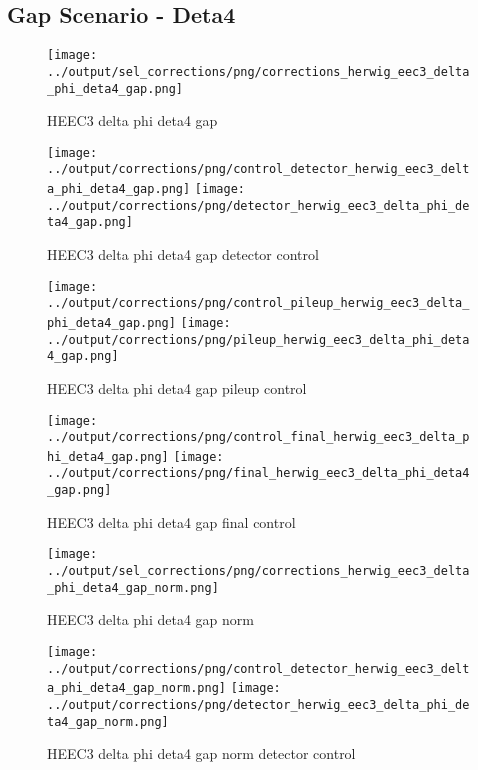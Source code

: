 \documentclass[11pt]{book}
\begin{document}
\clearpage
\subsection{Gap Scenario - Deta4}
\begin{figure}[ht]
\centering
\texttt{[image: ../output/sel\_corrections/png/corrections\_herwig\_eec3\_delta\_phi\_deta4\_gap.png]}
\caption{HEEC3 delta phi deta4 gap}
\label{fig:HEEC3_delta_phi_deta4_gap}
\end{figure}

\begin{figure}[ht]
\centering
\texttt{[image: ../output/corrections/png/control\_detector\_herwig\_eec3\_delta\_phi\_deta4\_gap.png]}
\texttt{[image: ../output/corrections/png/detector\_herwig\_eec3\_delta\_phi\_deta4\_gap.png]}
\caption{HEEC3 delta phi deta4 gap detector control}
\label{fig:HEEC3_delta_phi_deta4_gap_detector_control}
\end{figure}

\begin{figure}[ht]
\centering
\texttt{[image: ../output/corrections/png/control\_pileup\_herwig\_eec3\_delta\_phi\_deta4\_gap.png]}
\texttt{[image: ../output/corrections/png/pileup\_herwig\_eec3\_delta\_phi\_deta4\_gap.png]}
\caption{HEEC3 delta phi deta4 gap pileup control}
\label{fig:HEEC3_delta_phi_deta4_gap_pileup_control}
\end{figure}


\begin{figure}[ht]
\centering
\texttt{[image: ../output/corrections/png/control\_final\_herwig\_eec3\_delta\_phi\_deta4\_gap.png]}
\texttt{[image: ../output/corrections/png/final\_herwig\_eec3\_delta\_phi\_deta4\_gap.png]}
\caption{HEEC3 delta phi deta4 gap final control}
\label{fig:HEEC3_delta_phi_deta4_gap_final_control}
\end{figure}

\begin{figure}[ht]
\centering
\texttt{[image: ../output/sel\_corrections/png/corrections\_herwig\_eec3\_delta\_phi\_deta4\_gap\_norm.png]}
\caption{HEEC3 delta phi deta4 gap norm}
\label{fig:HEEC3_delta_phi_deta4_gap_norm}
\end{figure}


\begin{figure}[ht]
\centering
\texttt{[image: ../output/corrections/png/control\_detector\_herwig\_eec3\_delta\_phi\_deta4\_gap\_norm.png]}
\texttt{[image: ../output/corrections/png/detector\_herwig\_eec3\_delta\_phi\_deta4\_gap\_norm.png]}
\caption{HEEC3 delta phi deta4 gap norm detector control}
\label{fig:HEEC3_delta_phi_deta4_gap_norm_detector_control}
\end{figure}
\end{document}
